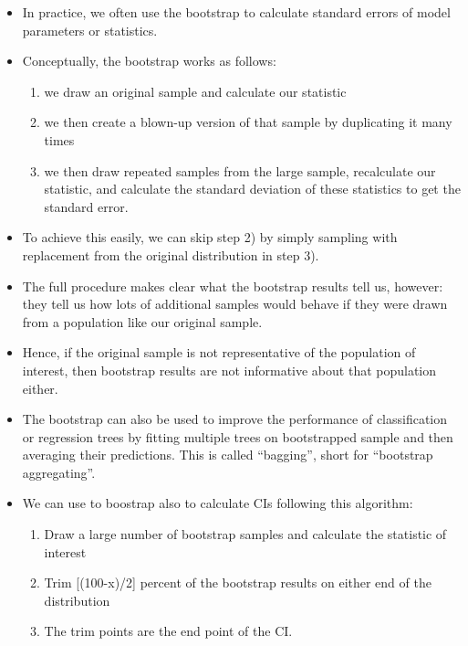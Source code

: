 \documentclass[
  letterpaper,
  DIV=11,
  numbers=noendperiod]{scrreprt}
\providecommand{\tightlist}{%
  \setlength{\itemsep}{0pt}\setlength{\parskip}{0pt}}\usepackage{longtable,booktabs,array}
\begin{document}
\begin{itemize}
\item
  In practice, we often use the bootstrap to calculate standard errors
  of model parameters or statistics.
\item
  Conceptually, the bootstrap works as follows:

  \begin{enumerate}
  \def\labelenumi{\arabic{enumi})}
  \tightlist
  \item
    we draw an original sample and calculate our statistic
  \item
    we then create a blown-up version of that sample by duplicating it
    many times
  \item
    we then draw repeated samples from the large sample, recalculate our
    statistic, and calculate the standard deviation of these statistics
    to get the standard error.
  \end{enumerate}
\item
  To achieve this easily, we can skip step 2) by simply sampling with
  replacement from the original distribution in step 3).
\item
  The full procedure makes clear what the bootstrap results tell us,
  however: they tell us how lots of additional samples would behave if
  they were drawn from a population like our original sample.
\item
  Hence, if the original sample is not representative of the population
  of interest, then bootstrap results are not informative about that
  population either.
\item
  The bootstrap can also be used to improve the performance of
  classification or regression trees by fitting multiple trees on
  bootstrapped sample and then averaging their predictions. This is
  called ``bagging'', short for ``bootstrap aggregating''.
\item
  We can use to boostrap also to calculate CIs following this algorithm:

  \begin{enumerate}
  \def\labelenumi{\arabic{enumi})}
  \tightlist
  \item
    Draw a large number of bootstrap samples and calculate the statistic
    of interest
  \item
    Trim {[}(100-x)/2{]} percent of the bootstrap results on either end
    of the distribution
  \item
    The trim points are the end point of the CI.
  \end{enumerate}
\end{itemize}
\end{document}
